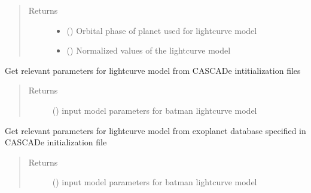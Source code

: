 \documentclass[a4paper,11pt,english]{sphinxmanual}
\begin{document}
\begin{fulllineitems}
\begin{fulllineitems}
\begin{quote}
\begin{description}
\item[{Returns}] \leavevmode
\begin{itemize}
\item {} 
 () \textendash{} Orbital phase of planet used for lightcurve model

\item {} 
 () \textendash{} Normalized values of the lightcurve model

\end{itemize}


\end{description}\end{quote}

\end{fulllineitems}


\begin{fulllineitems}
\label{\detokenize{cascade.exoplanet_tools:cascade.exoplanet_tools.exoplanet_tools.batman_model.ReturnParFromIni}}
Get relevant parameters for lightcurve model from CASCADe
intitialization files
\begin{quote}\begin{description}
\item[{Returns}] \leavevmode
{} () \textendash{} input model parameters for batman lightcurve model

\end{description}\end{quote}

\end{fulllineitems}


\begin{fulllineitems}
\label{\detokenize{cascade.exoplanet_tools:cascade.exoplanet_tools.exoplanet_tools.batman_model.ReturnParFromDB}}
Get relevant parameters for lightcurve model from exoplanet database
specified in CASCADe initialization file
\begin{quote}\begin{description}
\item[{Returns}] \leavevmode
{} () \textendash{} input model parameters for batman lightcurve model


\end{description}
\end{quote}
\end{fulllineitems}
\end{fulllineitems}
\end{document}
